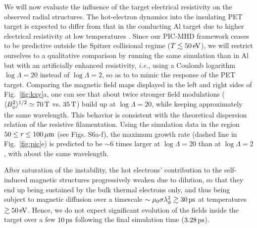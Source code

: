 \documentclass[aps,twocolumn,showpacs,superscriptaddress]{revtex4}
\begin{document}
We will now evaluate the influence of the target electrical resistivity on the observed radial structures. The hot-electron dynamics into the insulating PET target is expected to differ from that in the conducting Al target due to higher electrical resistivity at low temperatures \cite{PRL_Fuchs_2003,PRL_McKenna_2011}. Since our PIC-MHD framework ceases to be predictive outside the Spitzer collisional regime ($T\lesssim 50\,\rm eV$), we will restrict ourselves to a qualitative comparison by running the same simulation than in Al but with an artificially enhanced resistivity, \emph{i.e.}, using a Coulomb logarithm $\log \Lambda = 20$ instead of $\log \Lambda = 2$, so as to to mimic the response of the PET target. Comparing the magnetic field maps displayed in the left and right sides of Fig.~\ref{fig:kxy}a, one can see that about twice stronger field modulations ($\langle B_\phi^2 \rangle^{1/2} \simeq 70\,\rm T$ vs. $35\,\rm T$) build up at $\log \Lambda = 20$, while keeping approximately the same wavelength. This behavior is consistent with the theoretical dispersion relation of the resistive filamentation. Using the simulation data in the region $50 \le r \le 100\,\rm \mu m$ (see Figs. S6a-f), the maximum growth rate (dashed line in Fig.~\ref{fig:pic}e) is predicted to be $\sim 6$ times larger at $\log \Lambda = 20$ than at $\log \Lambda = 2$, with about the same wavelength.

After saturation of the instability, the hot electrons' contribution to the self-induced magnetic structures progressively weaken due to dilution, so that they end up being sustained by the bulk thermal electrons only, and thus being subject to magnetic diffusion over a timescale $\sim \mu_0 \sigma \lambda_\phi^2 \gtrsim 30\,\rm ps$ at temperatures $\gtrsim 50\,\rm eV$. Hence, we do not expect significant evolution of the fields inside the target over a few $10\,\rm ps$ following the final simulation time ($3.28\,\rm ps$).
\end{document}
